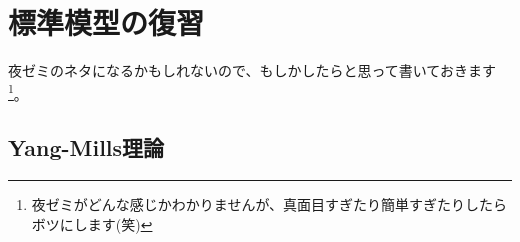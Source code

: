 \documentclass[unicode,a4paper,10pt]{ltjsarticle}
\renewcommand{\theequation}{\thesection.\arabic{equation}}
\renewcommand{\thefigure}{\thesection.\arabic{figure}}
\renewcommand{\thetable}{\thesection.\arabic{table}}
\begin{document}

\clearpage
\makeatletter
\renewcommand{\appendix}{\par
  \setcounter{section}{0}%
  \setcounter{subsection}{0}%
  \gdef\presectionname{\appendixname}%
  \gdef\postsectionname{}%
  \gdef\thesection{\presectionname\@Alph\c@section\postsectionname}%
  \gdef\thesubsection{\@Alph\c@section.\@arabic\c@subsection}%
  \renewcommand{\theequation}{\@Alph\c@section.\arabic{equation}}%
  \renewcommand{\thefigure}{\@Alph\c@section.\arabic{figure}}%
  \renewcommand{\thetable}{\@Alph\c@section.\arabic{table}}%
}
\makeatother
\appendix


\section{標準模型の復習}

夜ゼミのネタになるかもしれないので、もしかしたらと思って書いておきます\footnote{
   夜ゼミがどんな感じかわかりませんが、真面目すぎたり簡単すぎたりしたらボツにします(笑)
}。

\subsection{Yang-Mills理論}







\clearpage



\nocite{Peskin:1995}
\nocite{Wess:1992}
\nocite{Fujii:2005}
\nocite{Dine:2007zp}
\end{document}
